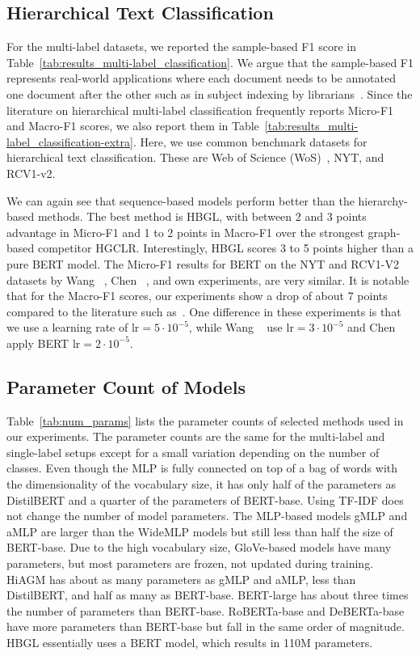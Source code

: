 \documentclass[acmsmall,nonacm]{acmart}
\newcommand{\mlp}{WideMLP\xspace}
\begin{document}
\subsection{Hierarchical Text Classification}
For the multi-label datasets, we reported the sample-based F1 score in
Table~\ref{tab:results_multi-label_classification}.  
We argue that the
sample-based F1 represents real-world applications where each document needs to
be annotated one document after the other such as in subject
indexing by librarians~\cite{DBLP:conf/kcap/GalkeMSBS17,DBLP:conf/jcdl/MaiGS18}.  
Since the
literature on hierarchical multi-label classification frequently reports Micro-F1
and Macro-F1 scores, we also report them in
Table~\ref{tab:results_multi-label_classification-extra}.
Here, we use common benchmark datasets for hierarchical text classification.
These are 
Web of Science (WoS)~\cite{DBLP:conf/icmla/KowsariBHMGB17}, NYT, and RCV1-v2.

We can again see that sequence-based models perform better than the
hierarchy-based methods.  The best method is HBGL, with between 2 and 3 points
advantage in Micro-F1 and 1 to 2 points in Macro-F1 over the strongest
graph-based competitor HGCLR.  Interestingly, HBGL scores 3 to 5 points higher
than a pure BERT model.
The Micro-F1 results for BERT on the NYT and RCV1-V2
datasets by Wang \etal~\cite{DBLP:conf/acl/WangWH0W22},
Chen \etal~\cite{DBLP:conf/acl/ChenMLY20}, and own experiments, are very similar.  
It is notable that for the Macro-F1 scores, our experiments show a drop of about 7
points compared to the literature such as~\cite{DBLP:conf/acl/WangWH0W22,DBLP:conf/acl/ChenMLY20}.  
One difference in these experiments is that we
use a learning rate of $\mathrm{lr}=5 \cdot 10^{-5} $, while Wang \etal~\cite{DBLP:conf/acl/WangWH0W22} use $\mathrm{lr}=3 \cdot 10^{-5}$ and
Chen \etal~\cite{DBLP:conf/acl/ChenMLY20} apply BERT $\mathrm{lr}=2 \cdot 10^{-5}$.

\subsection{Parameter Count of Models}
Table~\ref{tab:num_params} lists the parameter counts of selected methods used in our experiments. 
The parameter counts are the same for the multi-label and single-label setups except for a small variation depending on the number of classes. 
Even though the MLP is fully connected on top of a bag of words with the dimensionality of the vocabulary size, it has only half of the parameters as DistilBERT and a quarter of the parameters of BERT-base. 
Using TF-IDF does not change the number of model parameters. 
The MLP-based models gMLP and aMLP are larger than the \mlp models but still less than half the size of BERT-base.
Due to the high vocabulary size, GloVe-based models have many parameters, but most parameters are frozen, \ie not updated during training.
HiAGM has about as many parameters as gMLP and aMLP, less than DistilBERT, and half as many as BERT-base.
BERT-large has about three times the number of parameters than BERT-base.
RoBERTa-base and DeBERTa-base have more parameters than BERT-base but fall in the same order of magnitude.
HBGL essentially uses a BERT model, which results in 110M parameters.
\end{document}
